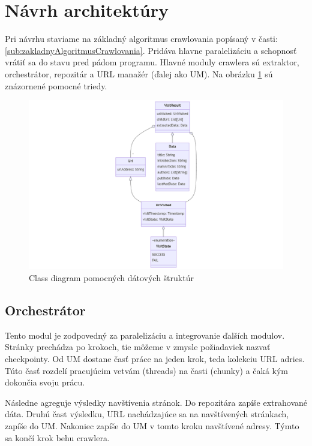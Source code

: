 \section{Návrh architektúry}

Pri návrhu staviame na základný algoritmus crawlovania popísaný v časti: \ref{sub:zakladnyAlgoritmusCrawlovania}. Pridáva hlavne paralelizáciu a schopnosť vrátiť sa do stavu pred pádom programu. Hlavné moduly crawlera sú  extraktor, orchestrátor, repozitár a URL manažér (ďalej ako UM).  Na obrázku \ref{o:classDiagramVisitResult} sú znázornené pomocné triedy.

\begin{figure}[!ht]
    \centering
    \includegraphics[width=.9\textwidth]{figures/classDiagramVisitResult.png}
    \caption{Class diagram pomocných dátových štruktúr \label{o:classDiagramVisitResult}}
\end{figure}


\subsection{Orchestrátor}
Tento modul je zodpovedný  za paralelizáciu a integrovanie ďalších modulov. Stránky prechádza po krokoch, tie môžeme v zmysle požiadaviek nazvať checkpointy. Od UM dostane časť práce na jeden krok, teda kolekciu URL adries. Túto časť rozdelí pracujúcim vetvám (threads) na časti (chunky) a čaká kým dokončia svoju prácu. 

Následne agreguje výsledky navštívenia stránok. Do repozitára zapíše extrahované dáta. Druhú čast výsledku, URL nachádzajúce sa na navštívených stránkach, zapíše do UM. Nakoniec zapíše do UM v tomto kroku navštívené adresy. Týmto sa končí krok behu crawlera.

